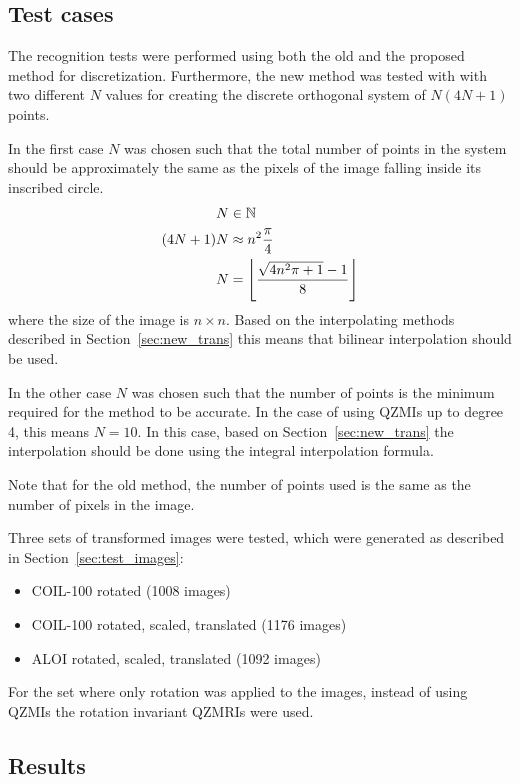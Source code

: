 \subsection{Test cases}
The recognition tests were performed using both the old and the proposed method for discretization. Furthermore, the new method was tested with with two different $N$ values for creating the discrete orthogonal system of $N(4N + 1)$ %
points.

In the first case $N$ was chosen such that the total number of points in the system should be approximately the same as the pixels of the image falling inside its inscribed circle.
\begin{gather*}
    \begin{split}
    N &\in \mathbb{N} \\
    (4N + 1)N &\approx n^2\frac{\pi}{4} \\
    N &= \left\lfloor \frac{\sqrt{4n^2\pi + 1} - 1}{8}\right\rfloor
    \end{split}
\end{gather*}
where the size of the image is $n \times n$. Based on the interpolating methods described in Section~\ref{sec:new_trans} this means that bilinear interpolation should be used.

In the other case $N$ was chosen such that the number of points is the minimum required for the method to be accurate. In the case of using QZMIs up to degree 4, this means $N = 10$. %
In this case, based on Section~\ref{sec:new_trans} the interpolation should be done using the integral interpolation formula.

Note that for the old method, the number of points used is the same as the number of pixels in the image.

Three sets of transformed images were tested, which were generated as described in Section~\ref{sec:test_images}:
\begin{itemize}
    \item COIL-100 rotated (1008 images)
    \item COIL-100 rotated, scaled, translated (1176 images)
    \item ALOI rotated, scaled, translated (1092 images)
\end{itemize} 
For the set where only rotation was applied to the images, instead of using QZMIs the rotation invariant QZMRIs were used.

\subsection{Results}

